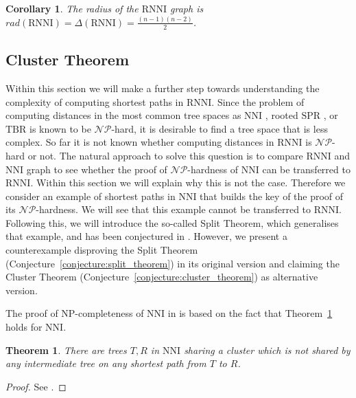 \documentclass{amsart}
\newcommand{\np}{\mathcal{NP}}
\newcommand{\nni}{\mathrm{NNI}}
\newcommand{\rnni}{\mathrm{RNNI}}
\newcommand{\tbr}{\mathrm{TBR}}
\newcommand{\spr}{\mathrm{SPR}}
\newtheorem{theorem}[definition]{Theorem}
\newtheorem{corollary}[definition]{Corollary}
\begin{document}
\begin{corollary}
    The radius of the $\rnni$ graph is $rad(\rnni) = \Delta(\rnni) = \frac{(n-1)(n-2)}{2}$.
    \label{corollary:radius}
\end{corollary}


\subsection{Cluster Theorem}
\label{section:cluster_theorem}

Within this section we will make a further step towards understanding the complexity of computing shortest paths in $\rnni$.
Since the problem of computing distances in the most common tree spaces as $\nni$ \autocite{Dasgupta2000-xa}, rooted $\spr$ \autocite{Bordewich2005-nx}, or $\tbr$ \autocite{Allen2001-ky} is known to be $\np$-hard, it is desirable to find a tree space that is less complex.
So far it is not known whether computing distances in $\rnni$ is $\np$-hard or not.
The natural approach to solve this question is to compare $\rnni$ and $\nni$ graph to see whether the proof of $\np$-hardness of $\nni$ can be transferred to $\rnni$.
Within this section we will explain why this is not the case.
Therefore we consider an example of shortest paths in $\nni$ that builds the key of the proof of its $\np$-hardness.
We will see that this example cannot be transferred to $\rnni$.
Following this, we will introduce the so-called Split Theorem, which generalises that example, and has been conjectured in \autocite{Gavryushkin2018-ol}.
However, we present a counterexample disproving the Split Theorem (Conjecture~\ref{conjecture:split_theorem}) in its original version and claiming the Cluster Theorem (Conjecture~\ref{conjecture:cluster_theorem}) as alternative version.

The proof of NP-completeness of $\nni$ in \autocite{Dasgupta2000-xa} is based on the fact that Theorem~\ref{thm:split_nni} holds for $\nni$.

\begin{theorem}
	There are trees $T,R$ in $\nni$ sharing a cluster which is not shared by any intermediate tree on any shortest path from $T$ to $R$.
	\label{thm:split_nni}
\end{theorem}

\begin{proof}
	See \autocite{Li1996-zw}.
\end{proof}
\end{document}
